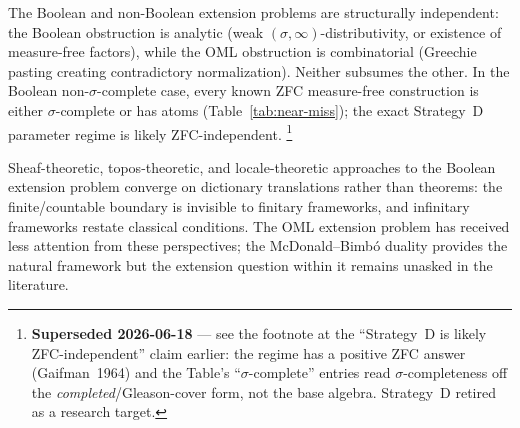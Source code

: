 The Boolean and non-Boolean extension problems are structurally
independent: the Boolean obstruction is analytic (weak
$(\sigma,\infty)$-distributivity, or existence of measure-free
factors), while the OML obstruction is combinatorial (Greechie
pasting creating contradictory normalization).  Neither subsumes the
other.  In the Boolean non-$\sigma$-complete case, every known ZFC
measure-free construction is either $\sigma$-complete or has atoms
(Table~\ref{tab:near-miss}); the exact Strategy~D parameter regime
is likely ZFC-independent.%
\footnote{\textbf{Superseded 2026-06-18} --- see the footnote at the
``Strategy~D is likely ZFC-independent'' claim earlier: the regime has a positive
ZFC answer (Gaifman~1964) and the Table's ``$\sigma$-complete'' entries read
$\sigma$-completeness off the \emph{completed}/Gleason-cover form, not the base
algebra. Strategy~D retired as a research target.}

Sheaf-theoretic, topos-theoretic, and locale-theoretic approaches
to the Boolean extension problem converge on dictionary translations
rather than theorems: the finite/countable boundary is invisible to
finitary frameworks, and infinitary frameworks restate classical
conditions.  The OML extension problem has received less attention
from these perspectives; the McDonald--Bimb\'{o} duality provides
the natural framework but the extension question within it remains
unasked in the literature.
